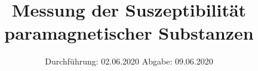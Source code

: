 

\subject{Versuch Nr. 606}
\title{Messung der Suszeptibilität paramagnetischer Substanzen}
\date{%
  Durchführung: 02.06.2020
  \hspace{3em}
  Abgabe: 09.06.2020
}


\setlength{\parindent}{0pt} %

\maketitle
\thispagestyle{empty}
\tableofcontents
\newpage








\printbibliography{}


